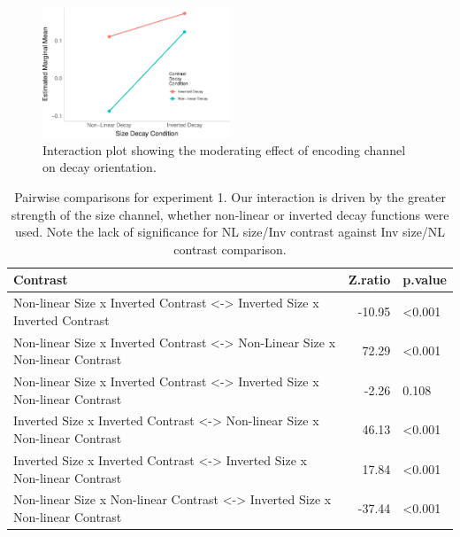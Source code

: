 \documentclass[manuscript, review, anonymous, screen]{acmart}
\begin{document}
\begin{figure}

\includegraphics[width=0.5\textwidth,height=\textheight]{size_and_contrast_new_files/figure-pdf/fig-interaction-plot-1.pdf} \hfill{}

\caption{\label{fig-interaction-plot}Interaction plot showing the
moderating effect of encoding channel on decay orientation.}

\end{figure}

\hypertarget{tbl-contrasts}{}
\begin{table}
\caption{\label{tbl-contrasts}Pairwise comparisons for experiment 1. Our interaction is driven by the
greater strength of the size channel, whether non-linear or inverted
decay functions were used. Note the lack of significance for NL size/Inv
contrast against Inv size/NL contrast comparison. }\tabularnewline

\centering
\begin{tabular}{lrl}
\toprule
Contrast & Z.ratio & p.value\\
\midrule
Non-linear Size x Inverted Contrast <-> Inverted Size x Inverted Contrast & -10.95 & <0.001\\
Non-linear Size x Inverted Contrast <-> Non-Linear Size x Non-linear Contrast & 72.29 & <0.001\\
Non-linear Size x Inverted Contrast <-> Inverted Size x Non-linear Contrast & -2.26 & 0.108\\
Inverted Size x Inverted Contrast <-> Non-linear Size x Non-linear Contrast & 46.13 & <0.001\\
Inverted Size x Inverted Contrast <-> Inverted Size x Non-linear Contrast & 17.84 & <0.001\\
\addlinespace
Non-linear Size x Non-linear Contrast <-> Inverted Size x Non-linear Contrast & -37.44 & <0.001\\
\bottomrule
\end{tabular}
\end{table}
\end{document}
